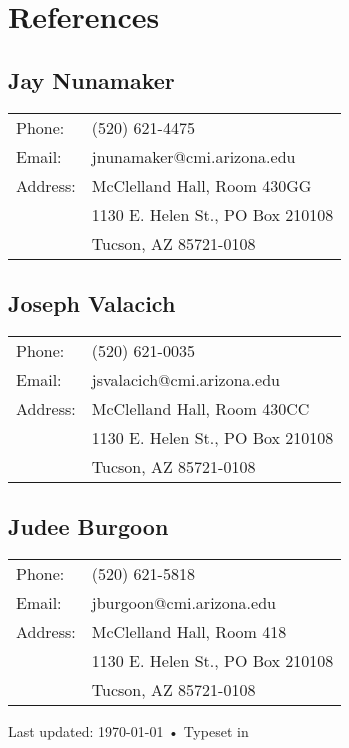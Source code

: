 \documentclass[10pt, a4paper]{article}
\begin{document}
\section*{References}

\subsection*{Jay Nunamaker} 

\begin{tabular}{ll}
  Phone: & (520) 621-4475 \\
  Email: & jnunamaker@cmi.arizona.edu\\
  Address: & McClelland Hall, Room 430GG\\
  & 1130 E. Helen St., PO Box 210108\\
  & Tucson, AZ 85721-0108
\end{tabular}

\subsection*{Joseph Valacich} 

\begin{tabular}{ll}
  Phone: & (520) 621-0035 \\
  Email: & jsvalacich@cmi.arizona.edu\\
  Address: & McClelland Hall, Room 430CC\\
  & 1130 E. Helen St., PO Box 210108\\
  & Tucson, AZ 85721-0108
\end{tabular}

\subsection*{Judee Burgoon} 

\begin{tabular}{ll}
  Phone: & (520) 621-5818 \\
  Email: & jburgoon@cmi.arizona.edu\\
  Address: & McClelland Hall, Room 418\\
  & 1130 E. Helen St., PO Box 210108\\
  & Tucson, AZ 85721-0108
\end{tabular}

\vfill{}

\begin{center}
{\scriptsize  Last updated: \today\- •\- 
Typeset in \href{http://nitens.org/taraborelli/cvtex}{
\XeTeX }\\
}
\end{center}
\end{document}
